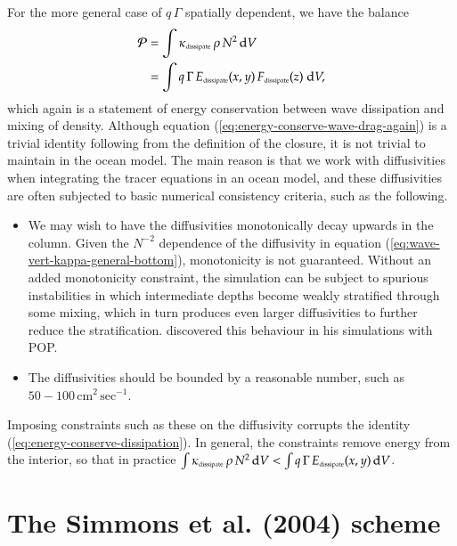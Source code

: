 For the more general case of $q \, \Gamma$ spatially dependent, we
have the balance
\begin{subequations}
\begin{align}
 {\cal P} &=  \int \kappa_{\mbox{\tiny dissipate}}  \, \rho \, N^{2} \, \mathrm{d}V
 \\
 &= \int q \, \Gamma \,  E_{\mbox{\tiny dissipate}}(x,y) \, F_{\mbox{\tiny dissipate}}(z) \; \mathrm{d}V,
\end{align}
\label{eq:energy-conserve-wave-drag-again}
\end{subequations}
which again is a statement of energy conservation between wave
dissipation and mixing of density.  Although equation
(\ref{eq:energy-conserve-wave-drag-again}) is a trivial identity
following from the definition of the closure, it is not trivial to
maintain in the ocean model.  The main reason is that we work with
diffusivities when integrating the tracer equations in an ocean model,
and these diffusivities are often subjected to basic numerical
consistency criteria, such as the following.
\begin{itemize}

\item We may wish to have the diffusivities monotonically decay
  upwards in the column.  Given the $N^{-2}$ dependence of the
  diffusivity in equation (\ref{eq:wave-vert-kappa-general-bottom}),
  monotonicity is not guaranteed.  Without an added monotonicity
  constraint, the simulation can be subject to spurious instabilities
  in which intermediate depths become weakly stratified through some
  mixing, which in turn produces even larger diffusivities to further
  reduce the stratification.  \cite{Jayne2009} discovered this
  behaviour in his simulations with POP.

\item The diffusivities should be bounded by a reasonable number, such
  as $50-100 \, \mbox{cm}^{2} \, \mbox{sec}^{-1}$.
\end{itemize}
Imposing constraints such as these on the diffusivity corrupts the
identity (\ref{eq:energy-conserve-dissipation}).  In general, the
constraints remove energy from the interior, so that in practice $\int
\kappa_{\mbox{\tiny dissipate}} \, \rho \, N^{2} \, \mathrm{d}V < \int
q \, \Gamma \, E_{\mbox{\tiny dissipate}}(x,y) \, \mathrm{d}V$.


\section{The Simmons et al. (2004) scheme}
\label{section:simmons-etal}

